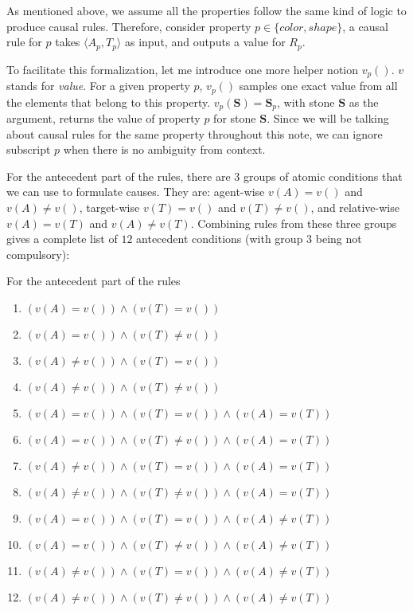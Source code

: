 \documentclass{article}
\begin{document}
As mentioned above, we assume all the properties follow the same kind of logic to produce causal rules. Therefore, consider property $p \in \{color, shape\}$, a causal rule for $p$ takes $\langle A_p, T_p \rangle$ as input, and outputs a value for $R_p$.

To facilitate this formalization, let me introduce one more helper notion $v_p()$. $v$ stands for \emph{value}. For a given property $p$, $v_p()$ samples one exact value from all the elements that belong to this property. $v_p(\mathbf{S}) = \mathbf{S}_p$, with stone $\mathbf{S}$ as the argument, returns the value of property $p$ for stone $\mathbf{S}$. Since we will be talking about causal rules for the same property throughout this note, we can ignore subscript $p$ when there is no ambiguity from context.

For the antecedent part of the rules, there are 3 groups of atomic conditions that we can use to formulate causes. They are: agent-wise $v(A) = v()$ and $v(A) \neq v()$, target-wise $v(T) = v()$ and $v(T) \neq v()$, and relative-wise $v(A) = v(T)$ and $v(A) \neq v(T)$. Combining rules from these three groups gives a complete list of $12$ antecedent conditions (with group 3 being not compulsory):

\newpage

For the antecedent part of the rules

\begin{enumerate}
\item $(v(A) = v()) \wedge (v(T) = v())$
\item $(v(A) = v()) \wedge (v(T) \neq v())$
\item $(v(A) \neq v()) \wedge (v(T) = v())$
\item $(v(A) \neq v()) \wedge (v(T) \neq v())$
\item $(v(A) = v()) \wedge (v(T) = v()) \wedge (v(A) = v(T))$
\item $(v(A) = v()) \wedge (v(T) \neq v()) \wedge (v(A) = v(T))$
\item $(v(A) \neq v()) \wedge (v(T) = v()) \wedge (v(A) = v(T))$
\item $(v(A) \neq v()) \wedge (v(T) \neq v()) \wedge (v(A) = v(T))$
\item $(v(A) = v()) \wedge (v(T) = v()) \wedge (v(A) \neq v(T))$
\item $(v(A) = v()) \wedge (v(T) \neq v()) \wedge (v(A) \neq v(T))$
\item $(v(A) \neq v()) \wedge (v(T) = v()) \wedge (v(A) \neq v(T))$
\item $(v(A) \neq v()) \wedge (v(T) \neq v()) \wedge (v(A) \neq v(T))$
\end{enumerate}
\end{document}
